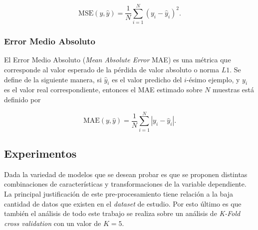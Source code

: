 \documentclass[spanish]{article}
\begin{document}
                \begin{equation}
                    \text{MSE}(y, \hat{y}) = \frac{1}{N} \sum_{i=1}^{N} (y_i - \hat{y}_i)^2.
                \end{equation}

            
            \subsubsection{Error Medio Absoluto}
            
                El Error Medio Absoluto (\emph{Mean Absolute Error} MAE) es una métrica que corresponde al valor esperado de la pérdida 
                de valor absoluto o norma $L1$. Se define de la siguiente manera, si $\hat{y}_i$ es el valor predicho del $i$-ésimo ejemplo, y $y_i$ 
                es el valor real correspondiente, entonces el MAE estimado sobre $N$ muestras está definido por
                
                \begin{equation}
                    \text{MAE}(y, \hat{y}) = \frac{1}{N} \sum_{i=1}^{N} \left| y_i - \hat{y}_i \right|.
                \end{equation}

    
        \subsection{Experimentos}
        
            Dada la variedad de modelos que se desean probar es que se proponen distintas combinaciones de características y transformaciones de la variable
            dependiente. La principal justificación de este pre-procesamiento tiene relación a la baja cantidad de datos que existen en el \emph{dataset} de 
            estudio. Por esto último es que también el análisis de todo este trabajo se realiza sobre un análisis de \emph{K-Fold cross validation} con un 
            valor de $K=5$. \\
            
\end{document}
